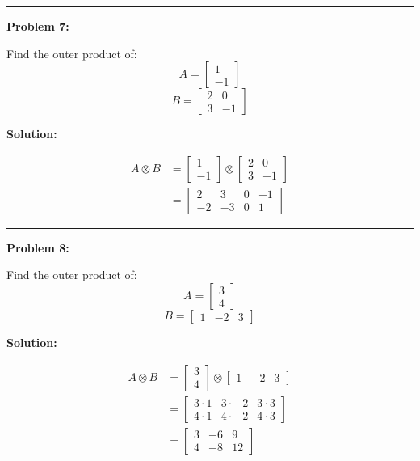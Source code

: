 \documentclass[
  letterpaper,
  DIV=11,
  numbers=noendperiod]{scrreprt}
\theoremstyle{plain}
\theoremstyle{definition}
\theoremstyle{remark}
\begin{document}
\begin{center}\rule{0.5\linewidth}{0.5pt}\end{center}

\textbf{Problem 7:}

Find the outer product of: \[A=\begin{bmatrix}1\\-1\end{bmatrix}\]
\[B=\begin{bmatrix}2&0\\3&-1\end{bmatrix}\]

\textbf{Solution:}

\begin{align*}
A \otimes B &=\begin{bmatrix}1\\-1\end{bmatrix}\otimes \begin{bmatrix}2&0\\3&-1\end{bmatrix}\\
&= \begin{bmatrix}
2 & 3&0&-1 \\
-2&-3&0&1
\end{bmatrix}
\end{align*}

\begin{center}\rule{0.5\linewidth}{0.5pt}\end{center}

\textbf{Problem 8:}

Find the outer product of: \[A=\begin{bmatrix}3\\4\end{bmatrix}\]
\[B=\begin{bmatrix}1&-2&3\end{bmatrix}\]

\textbf{Solution:}

\begin{align*}
A \otimes B &= \begin{bmatrix}3\\4\end{bmatrix} \otimes \begin{bmatrix}1&-2&3\end{bmatrix} \\
&= \begin{bmatrix}
3 \cdot 1 & 3 \cdot -2 & 3 \cdot 3 \\
4 \cdot 1 & 4 \cdot -2 & 4 \cdot 3
\end{bmatrix} \\
&= \begin{bmatrix}
3 & -6 & 9 \\
4 & -8 & 12
\end{bmatrix}
\end{align*}
\end{document}
